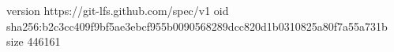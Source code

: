 version https://git-lfs.github.com/spec/v1
oid sha256:b2c3cc409f9bf5ae3ebcf955b0090568289dcc820d1b0310825a80f7a55a731b
size 446161
